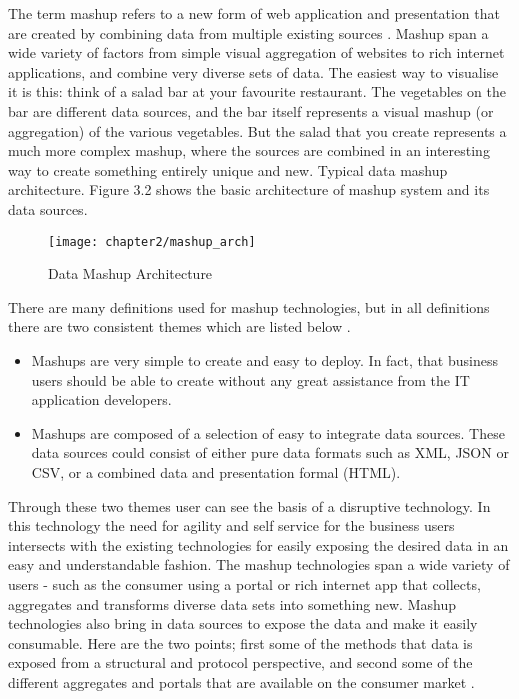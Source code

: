 The term mashup refers to a new form of web application and presentation that are created by combining data from multiple existing sources \cite{gomez2004ontological}. Mashup span a wide variety of factors from simple visual aggregation of websites to rich internet applications, and combine very diverse sets of data. The easiest way to visualise it is this: think of a salad bar at your favourite restaurant. The vegetables on the bar are different data sources, and the bar itself represents a visual mashup (or aggregation) of the various vegetables. But the salad that you create represents a much more complex mashup, where the sources are combined in an interesting way to create something entirely unique and new. Typical data mashup architecture. Figure 3.2 shows the basic architecture of mashup system and its data sources.

\begin{figure}[H]
\centering
\texttt{[image: chapter2/mashup\_arch]}
\caption{Data Mashup Architecture }
\end{figure}

There are many definitions used for mashup technologies, but in all definitions there are two consistent themes which are listed below \cite{fung2012service}.

\begin{itemize}
\item Mashups are very simple to create and easy to deploy. In fact, that business users should be able to create without any great assistance from the IT application developers.
\item Mashups are composed of a selection of easy to integrate data sources. These data sources could consist of either pure data formats such as XML, JSON or CSV, or a combined data and presentation formal (HTML).
\end{itemize}

Through these two themes user can see the basis of a disruptive technology. In this technology the need for agility and self service for the business users intersects with the existing technologies for easily exposing the desired data in an easy and understandable fashion. The mashup technologies span a wide variety of users - such as the consumer using a portal or rich internet app that collects, aggregates and transforms diverse data sets into something new. Mashup technologies also bring in data sources to expose the data and make it easily consumable. Here are the two points; first some of the methods that data is exposed from a structural and protocol perspective, and second some of the different aggregates and portals that are available on the consumer market \cite{arafati2014d}.

